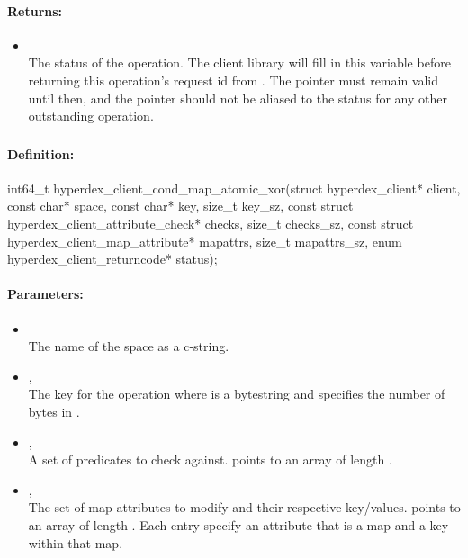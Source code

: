 \paragraph{Returns:}
\begin{itemize}[noitemsep]
\item {}\\
The status of the operation.  The client library will fill in this variable before returning this operation's request id from .  The pointer must remain valid until then, and the pointer should not be aliased to the status for any other outstanding operation.
\end{itemize}

\pagebreak
\subsubsection{}
\label{api:c:cond_map_atomic_xor}


\paragraph{Definition:}
\begin{ccode}
int64_t hyperdex_client_cond_map_atomic_xor(struct hyperdex_client* client,
        const char* space,
        const char* key, size_t key_sz,
        const struct hyperdex_client_attribute_check* checks, size_t checks_sz,
        const struct hyperdex_client_map_attribute* mapattrs, size_t mapattrs_sz,
        enum hyperdex_client_returncode* status);
\end{ccode}

\paragraph{Parameters:}
\begin{itemize}[noitemsep]
\item {}\\
The name of the space as a c-string.
\item {}, \\
The key for the operation where  is a bytestring and  specifies the number of bytes in .
\item {}, \\
A set of predicates to check against.   points to an array of length .
\item {}, \\
The set of map attributes to modify and their respective key/values.   points to an array of length .  Each entry specify an attribute that is a map and a key within that map.
\end{itemize}

